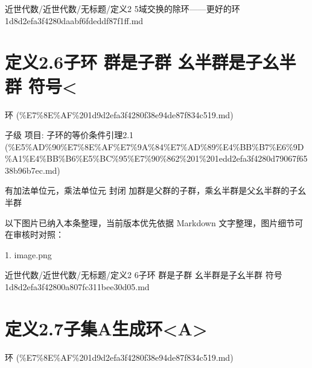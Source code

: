 \begin{note}[来源路径]

近世代数/近世代数/无标题/定义2 5域交换的除环——更好的环 1d8d2efa3f4280daabf6fdeddf87f1ff.md

\end{note}

\section*{定义2.6子环 群是子群 幺半群是子幺半群 符号<}

\begin{note}[来源上级主题]

环 (\%E7\%8E\%AF\%201d9d2efa3f4280f38e94de87f834c519.md)

\end{note}

\begin{definition}

子级 项目: 子环的等价条件引理2.1 (\%E5\%AD\%90\%E7\%8E\%AF\%E7\%9A\%84\%E7\%AD\%89\%E4\%BB\%B7\%E6\%9D\%A1\%E4\%BB\%B6\%E5\%BC\%95\%E7\%90\%862\%201\%201edd2efa3f4280d79067f6538b96b7ec.md)

有加法单位元，乘法单位元 封闭 加群是父群的子群，乘幺半群是父幺半群的子幺半群

\end{definition}

\begin{note}[关联图片]
以下图片已纳入本条整理，当前版本优先依据 Markdown 文字整理，图片细节可在审核时对照：

1. image.png\\

\end{note}

\begin{note}[来源路径]

近世代数/近世代数/无标题/定义2 6子环 群是子群 幺半群是子幺半群 符号 1d8d2efa3f42800a807fc311bee30d05.md

\end{note}

\section*{定义2.7子集A生成环<A>}

\begin{note}[来源上级主题]

环 (\%E7\%8E\%AF\%201d9d2efa3f4280f38e94de87f834c519.md)

\end{note}

